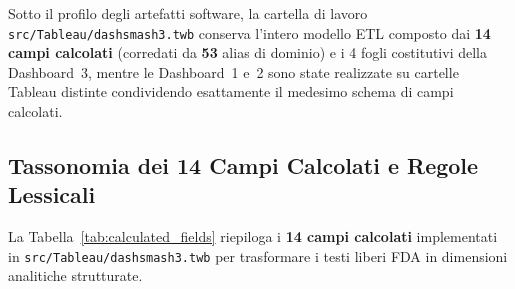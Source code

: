 Sotto il profilo degli artefatti software, la cartella di lavoro \texttt{src/Tableau/dashsmash3.twb} conserva l'intero modello ETL composto dai \textbf{14 campi calcolati} (corredati da \textbf{53} alias di dominio) e i 4 fogli costitutivi della Dashboard~3, mentre le Dashboard~1 e~2 sono state realizzate su cartelle Tableau distinte condividendo esattamente il medesimo schema di campi calcolati.

\subsection{Tassonomia dei 14 Campi Calcolati e Regole Lessicali}
La Tabella~\ref{tab:calculated_fields} riepiloga i \textbf{14 campi calcolati} implementati in \texttt{src/Tableau/dashsmash3.twb} per trasformare i testi liberi FDA in dimensioni analitiche strutturate.

